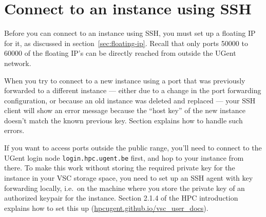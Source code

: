 \section{Connect to an instance using SSH}\label{connect-to-your-instance-using-ssh}
Before you can connect to an instance using SSH, you must set up a
floating IP for it, as discussed in section~\ref{sec:floating-ip}.
Recall that only ports 50000 to 60000 of the floating IP's can be
directly reached from outside the UGent network.

 When you try to connect to a new instance using a port
that was previously forwarded to a different instance --- either due
to a change in the port forwarding configuration, or because an old
instance was deleted and replaced --- your SSH client will show an
error message because the ``host key'' of the new instance doesn't
match the known previous key.  Section 
explains how to handle such errors.

 If you want to access ports outside the public range,
you'll need to connect to the UGent login node
\lstinline{login.hpc.ugent.be} first, and hop to your instance from
there.  To make this work without storing the required private key for
the instance in your VSC storage space, you need to set up an SSH
agent with key forwarding locally, i.e.\ on the machine where you
store the private key of an authorized keypair for the instance.
Section 2.1.4 of the HPC introduction explains how to set this up
(\href{https://hpcugent.github.io/vsc\_user\_docs}{hpcugent.github.io/vsc\_user\_docs}).

